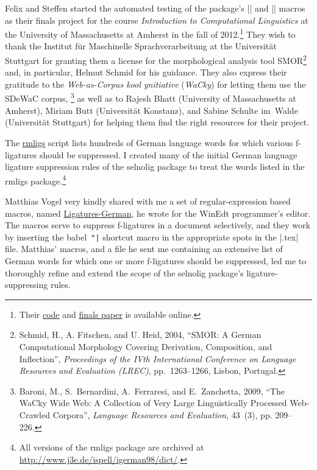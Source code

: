 \documentclass[11pt]{article}
\newcommand{\pkg}[1]{\textsf{#1}}
\begin{document}
Felix and Steffen started the automated testing of the package's |\nolig| and |\keeplig| macros as their finals project for the course \emph{Introduction to Computational Linguistics} at the University of Massachusetts at Amherst in the fall of 2012.\footnote{Their \href{https://github.com/SHildebrandt/selnolig-check}{code} and \href{https://github.com/SHildebrandt/selnolig-check/blob/master/selnolig-check-documentation.pdf?raw=true}{finals paper} is available online.} They wish to thank the Institut für Maschinelle Sprachverarbeitung at the Universität Stuttgart for granting them a license for the morphological analysis tool SMOR\footnote{Schmid, H., A. Fitschen, and U. Heid, 2004, \enquote{SMOR: A German Computational Morphology Covering Derivation, Composition, and Inflection}, \emph{Proceedings of the IVth International Conference on Language Resources and Evaluation (LREC)}, pp.~1263--1266, Lisbon, Portugal.} and, in particular, Helmut Schmid for his guidance. They also express their gratitude to the \emph{Web-as-Corpus kool ynitiative} (\emph{WaCky}) for letting them use the SDeWaC corpus,%
\footnote{Baroni, M., S.~Bernardini, A.~Ferraresi, and E.~Zanchetta, 2009, \enquote{The WaCky Wide Web: A Collection of Very Large Linguistically Processed Web-Crawled Corpora}, \emph{Language Resources and Evaluation}, 43~(3), pp. 209--226.} as well as to Rajesh Bhatt (University of Massachusetts at Amherst), Miriam Butt (Universität Konstanz), and Sabine Schulte im~Walde (Universität Stuttgart) for helping them find the right resources for their project.

The \href{http://www.ctan.org/tex-archive/support/rmligs}{\pkg{rmligs}} script lists hundreds of German language words for which various f\nobreak-liga\-tures should be suppressed. I created many of the initial German language ligature suppression rules of the \pkg{selnolig} package to treat the words listed in the \pkg{rmligs} package.\footnote{All versions of the \pkg{rmligs} package are archived at \url{http://www.j3e.de/ispell/igerman98/dict/}.} 

Matthias Vogel very kindly shared with me a set of regular-expression based macros, named \href{http://www.winedt.org/Macros/LaTeX/Ligatures-German.php}{Ligatures-German}, he wrote for the WinEdt programmer's editor. The macros serve to suppress f-ligatures in a document selectively, and they work by inserting the \pkg{babel}~\Verb+"|+ shortcut macro in the appropriate spots in the |.tex| file. Matthias' macros, and a file he sent me containing an extensive list of German words for which one or more f-ligatures should be suppressed, led me to thoroughly refine and extend the scope of the \pkg{selnolig} package's ligature-suppressing rules.
\end{document}
